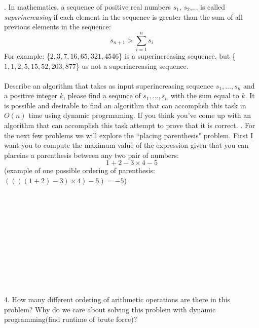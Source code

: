\documentclass[12pt]{article}
\begin{document}
\newpage
{}. In mathematics, a sequence of positive real numbers 
$s_1$, $s_2$,$\dots$ is called \textit{superincreasing} if each element
in the sequence is greater than the sum of all previous elements in the sequence:
$$s_{n+1} > \sum\limits_{i=1}^{n}s_i$$
For example: \{$2,3,7,16,65,321,4546$\} is a superincreasing sequence, 
but \{$1,1,2,5,15,52,203,877$\} us not a superincreasing sequence.\\\\
Describe an algorithm that takes as input superincreasing sequence $s_1,\dots,s_n$ and a positive 
integer $k$, please find a sequnce of $s_1,\dots,s_n$ with the sum equal
to $k$. It is possible and desirable to find an algorithm that can accomplish this
task in $O(n)$ time using dynamic progrmaming. If you think you've come up with an
algorithm that can accomplish this task attempt to prove that it is correct.
\newpage
{}. For the next few problems we will explore the ``placing parenthesis" problem. First
I want you to compute the maximum value of the expression given that you can placeins
a parenthesis between any two pair of numbers:\\
$$1+2-3 \times 4-5$$
(example of one possible ordering of parenthesis:$((((1+2)-3) \times 4)-5)=-5$)\\\\\\\\\\\\\\\\\\\\\\\\
4. How many different ordering of arithmetic operations are there in this problem? 
Why do we care about solving this problem with dynamic programming(find runtime of brute force)?\\\\\\\\\\\\\\\\\\\\\\\\
\newpage
\end{document}
